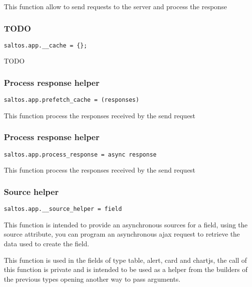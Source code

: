\documentclass[a4paper]{article}
\begin{document}
This function allow to send requests to the server and process the response

\hypertarget{toc567}{}
\subsubsection{TODO}

\begin{lstlisting}
saltos.app.__cache = {};
\end{lstlisting}

TODO

\hypertarget{toc568}{}
\subsubsection{Process response helper}

\begin{lstlisting}
saltos.app.prefetch_cache = (responses)
\end{lstlisting}

This function process the responses received by the send request

\hypertarget{toc569}{}
\subsubsection{Process response helper}

\begin{lstlisting}
saltos.app.process_response = async response
\end{lstlisting}

This function process the responses received by the send request

\hypertarget{toc570}{}
\subsubsection{Source helper}

\begin{lstlisting}
saltos.app.__source_helper = field
\end{lstlisting}

This function is intended to provide an asynchronous sources for a field, using the source attribute,
you can program an asynchronous ajax request to retrieve the data used to create the field.

This function is used in the fields of type table, alert, card and chartjs, the call of this function
is private and is intended to be used as a helper from the builders of the previous types opening
another way to pass arguments.
\end{document}
